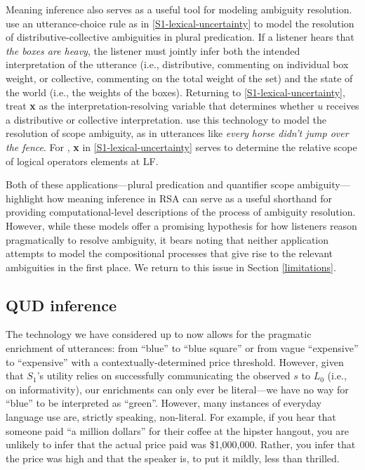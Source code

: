\documentclass{sp}
\begin{document}
Meaning inference also serves as a useful tool for modeling ambiguity resolution. \cite{scontrasgoodman2017} use an utterance-choice rule as in \eqref{S1-lexical-uncertainty} to model the resolution of distributive-collective ambiguities in plural predication. If a listener hears that \emph{the boxes are heavy}, the listener must jointly infer both the intended interpretation of the utterance (i.e., distributive, commenting on individual box weight, or collective, commenting on the total weight of the set) and the state of the world (i.e., the weights of the boxes). Returning to \eqref{S1-lexical-uncertainty}, \citeauthor{scontrasgoodman2017} treat \textbf{x} as the interpretation-resolving variable that determines whether $u$ receives a distributive or collective interpretation. \cite{savinellietal2017,savinellietal2018} use this technology to model the resolution of scope ambiguity, as in utterances like \emph{every horse didn't jump over the fence}. For \citeauthor{savinellietal2017}, \textbf{x} in \eqref{S1-lexical-uncertainty} serves to determine the relative scope of logical operators elements at LF.

Both of these applications---plural predication and quantifier scope ambiguity---highlight how meaning inference in RSA can serve as a useful shorthand for providing computational-level descriptions of the process of ambiguity resolution. However, while these models offer a promising hypothesis for how listeners reason pragmatically to resolve ambiguity, it bears noting that neither application attempts to model the compositional processes that give rise to the relevant ambiguities in the first place. We return to this issue in Section \ref{limitations}.


\subsection{QUD inference}

The technology we have considered up to now allows for the pragmatic enrichment of utterances: from ``blue'' to ``blue square'' or from vague ``expensive'' to ``expensive'' with a contextually-determined price threshold. However, given that $S_1$'s utility relies on successfully communicating the observed $s$ to $L_0$ (i.e., on informativity), our enrichments can only ever be literal---we have no way for ``blue'' to be interpreted as ``green''. However, many instances of everyday language use are, strictly speaking, non-literal. For example, if you hear that someone paid ``a million dollars'' for their coffee at the hipster hangout, you are unlikely to infer that the actual price paid was \$1,000,000. Rather, you infer that the price was high and that the speaker is, to put it mildly, less than thrilled.
\end{document}
